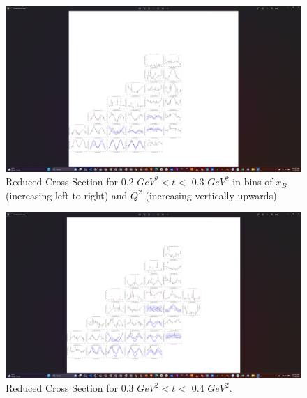 \iffalse

\begin{figure}[ht]
\centering
\includegraphics[trim={14.6cm 4cm 27.2cm 4cm},clip,width=\textwidth]{Chapters/Ch4-BaseAnalysis/bin_by_bin_cross_sections/pics_screenshots/t_2.png}
\caption[Reduced Cross Section for 0.2 $GeV^2 < t <$ 0.3 $ GeV^2$]{Reduced Cross Section for 0.2 $ GeV^2 < t <$ 0.3 $GeV^2$ in bins of $x_B$ (increasing left to right) and $Q^2$ (increasing vertically upwards). }
\label{fig:combined_t0.2}
\end{figure}


\begin{figure}[ht]
\centering
\includegraphics[trim={14.1cm 4cm 27.2cm 4cm},clip,width=\textwidth]{Chapters/Ch4-BaseAnalysis/bin_by_bin_cross_sections/pics_screenshots/t_3.png}
\caption[Reduced Cross Section for 0.3 $GeV^2 < t <$ 0.4 $ GeV^2$]{Reduced Cross Section for 0.3 $ GeV^2 < t <$ 0.4 $GeV^2$.}
\label{fig:combined_t0.3}
\end{figure}


